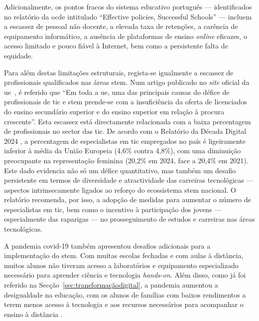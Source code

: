 Adicionalmente, os pontos fracos do sistema educativo português — identificados no relatório da \acrshort{ocde} intitulado ``Effective policies, Successful Schools'' \cite{pisa2018volumeV} — incluem a escassez de pessoal não docente, a elevada taxa de retenções, a carência de equipamento informático, a ausência de plataformas de ensino \textit{online} eficazes, o acesso limitado e pouco fiável à Internet, bem como a persistente falta de equidade.

Para além destas limitações estruturais, regista-se igualmente a escassez de profissionais qualificados nas áreas \acrshort{stem}. Num artigo publicado no \textit{site} oficial da \acrshort{ue}~\cite{cedefop}, é referido que ``Em toda a \acrshort{ue}, uma das principais causas do défice de profissionais de \acrshort{tic} e \acrshort{stem} prende-se com a insuficiência da oferta de licenciados do ensino secundário superior e do ensino superior em relação à procura crescente''. Esta escassez está directamente relacionada com a baixa percentagem de profissionais no sector das \acrshort{tic}. De acordo com o Relatório da Década Digital 2024 \cite{DigitalDecade2024}, a percentagem de especialistas em \acrshort{tic} empregados no país é ligeiramente inferior à média da União Europeia (4,6\% contra 4,8\%), com uma diminuição preocupante na representação feminina (20,2\% em 2024, face a 20,4\% em 2021). Este dado evidencia não só um défice quantitativo, mas também um desafio persistente em termos de diversidade e atractividade das carreiras tecnológicas — aspectos intrinsecamente ligados ao reforço do ecossistema \acrshort{stem} nacional. O relatório recomenda, por isso, a adopção de medidas para aumentar o número de especialistas em \acrshort{tic}, bem como o incentivo à participação dos jovens — especialmente das raparigas — no prosseguimento de estudos e carreiras nas áreas tecnológicas. %

A pandemia \acrshort{covid-19} também apresentou desafios adicionais para a implementação do \acrshort{stem}. Com muitas escolas fechadas e com aulas à distância, muitos alunos não tiveram acesso a laboratórios e equipamento especializado necessário para aprender ciência e tecnologia \textit{hands-on}. Além disso, como já foi referido na Secção~\ref{sec:transformaçãodigital}, a pandemia aumentou a desigualdade na educação, com os alunos de famílias com baixos rendimentos a terem menos acesso à tecnologia e aos recursos necessários para acompanhar o ensino à distância \cite{desigualdadespandemia, efeitospandemiadigital}.

